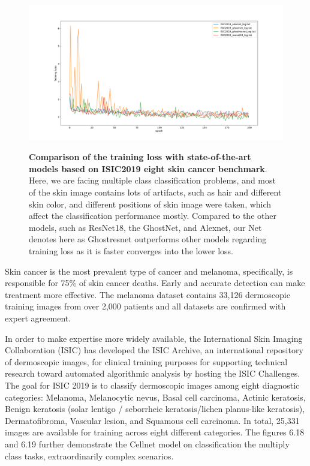 {\begin{figure}[t]
\includegraphics[height=0.4\textheight,width=1\textwidth]{thesis-template-master/images/loss_train.png}
\label{fig:cellnet}
\caption{ \textbf{Comparison of the training loss with state-of-the-art models based on ISIC2019 eight skin cancer benchmark}. Here, we are facing multiple class classification problems, and most of the skin image contains lots of artifacts, such as hair and different skin color, and different positions of skin image were taken, which affect the classification performance mostly. Compared to the other models, such as ResNet18, the GhostNet, and Alexnet, our Net denotes here as Ghostresnet outperforms other models regarding training loss as it is faster converges into the lower loss. }
\end{figure}

Skin cancer is the most prevalent type of cancer and melanoma, specifically, is responsible for 75\% of skin cancer deaths. Early and accurate detection can make treatment more effective. The melanoma dataset contains 33,126 dermoscopic training images from over 2,000 patients and all datasets are confirmed with expert agreement.

In order to make expertise more widely available, the International Skin Imaging Collaboration (ISIC) has developed the ISIC Archive, an international repository of dermoscopic images, for clinical training purposes for supporting technical research toward automated algorithmic analysis by hosting the ISIC Challenges.
The goal for ISIC 2019 is to classify dermoscopic images among eight diagnostic categories: Melanoma, Melanocytic nevus, Basal cell carcinoma, Actinic keratosis, Benign keratosis (solar lentigo / seborrheic keratosis/lichen planus-like keratosis), Dermatofibroma, Vascular lesion, and Squamous cell carcinoma. In total, 25,331 images are available for training across eight different categories. The figures 6.18 and 6.19 further demonstrate the Cellnet model on classification the multiply class tasks, extraordinarily complex scenarios.

}
